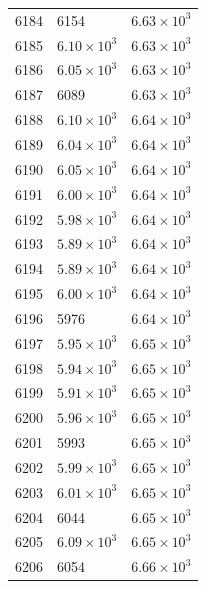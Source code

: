 \begin{table}[H]
\begin{tabular}{lll}
6184 & 6154 & $\displaystyle 6.63 \times 10^{3}$ \\
6185 & $\displaystyle 6.10 \times 10^{3}$ & $\displaystyle 6.63 \times 10^{3}$ \\
6186 & $\displaystyle 6.05 \times 10^{3}$ & $\displaystyle 6.63 \times 10^{3}$ \\
6187 & 6089 & $\displaystyle 6.63 \times 10^{3}$ \\
6188 & $\displaystyle 6.10 \times 10^{3}$ & $\displaystyle 6.64 \times 10^{3}$ \\
6189 & $\displaystyle 6.04 \times 10^{3}$ & $\displaystyle 6.64 \times 10^{3}$ \\
6190 & $\displaystyle 6.05 \times 10^{3}$ & $\displaystyle 6.64 \times 10^{3}$ \\
6191 & $\displaystyle 6.00 \times 10^{3}$ & $\displaystyle 6.64 \times 10^{3}$ \\
6192 & $\displaystyle 5.98 \times 10^{3}$ & $\displaystyle 6.64 \times 10^{3}$ \\
6193 & $\displaystyle 5.89 \times 10^{3}$ & $\displaystyle 6.64 \times 10^{3}$ \\
6194 & $\displaystyle 5.89 \times 10^{3}$ & $\displaystyle 6.64 \times 10^{3}$ \\
6195 & $\displaystyle 6.00 \times 10^{3}$ & $\displaystyle 6.64 \times 10^{3}$ \\
6196 & 5976 & $\displaystyle 6.64 \times 10^{3}$ \\
6197 & $\displaystyle 5.95 \times 10^{3}$ & $\displaystyle 6.65 \times 10^{3}$ \\
6198 & $\displaystyle 5.94 \times 10^{3}$ & $\displaystyle 6.65 \times 10^{3}$ \\
6199 & $\displaystyle 5.91 \times 10^{3}$ & $\displaystyle 6.65 \times 10^{3}$ \\
6200 & $\displaystyle 5.96 \times 10^{3}$ & $\displaystyle 6.65 \times 10^{3}$ \\
6201 & 5993 & $\displaystyle 6.65 \times 10^{3}$ \\
6202 & $\displaystyle 5.99 \times 10^{3}$ & $\displaystyle 6.65 \times 10^{3}$ \\
6203 & $\displaystyle 6.01 \times 10^{3}$ & $\displaystyle 6.65 \times 10^{3}$ \\
6204 & 6044 & $\displaystyle 6.65 \times 10^{3}$ \\
6205 & $\displaystyle 6.09 \times 10^{3}$ & $\displaystyle 6.65 \times 10^{3}$ \\
6206 & 6054 & $\displaystyle 6.66 \times 10^{3}$ \\

\end{tabular}
\end{table}
